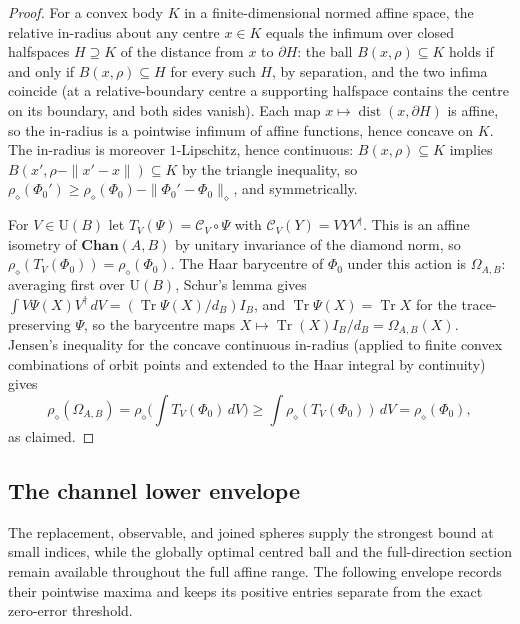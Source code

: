 \documentclass[11pt,a4paper]{article}
\theoremstyle{definition}
\theoremstyle{plain}
\theoremstyle{remark}
\DeclareMathOperator{\Tr}{Tr}
\newcommand{\Chan}{\mathbf{Chan}}
\begin{document}
\begin{proof}
For a convex body $K$ in a finite-dimensional normed affine space, the
relative in-radius about any centre $x\in K$ equals the infimum over closed
halfspaces $H\supseteq K$ of the distance from $x$ to $\partial H$: the ball
$B(x,\rho)\subseteq K$ holds if and only if $B(x,\rho)\subseteq H$ for every
such $H$, by separation, and the two infima coincide (at a
relative-boundary centre a supporting halfspace contains the centre on its
boundary, and both sides vanish). Each map
$x\mapsto\operatorname{dist}(x,\partial H)$ is affine, so the in-radius is
a pointwise infimum of affine functions, hence concave on $K$. The in-radius
is moreover $1$-Lipschitz, hence continuous: $B(x,\rho)\subseteq K$ implies
$B(x',\rho-\|x'-x\|)\subseteq K$ by the triangle inequality, so
$\rho_\diamond(\Phi_0')\ge\rho_\diamond(\Phi_0)-\|\Phi_0'-\Phi_0\|_\diamond$,
and symmetrically.

For $V\in\mathrm U(B)$ let $T_V(\Psi)=\mathcal C_V\circ\Psi$ with
$\mathcal C_V(Y)=VYV^\dagger$. This is an affine isometry of
$\Chan(A,B)$ by unitary invariance of the diamond norm, so
$\rho_\diamond(T_V(\Phi_0))=\rho_\diamond(\Phi_0)$. The Haar barycentre of
$\Phi_0$ under this action is $\Omega_{A,B}$: averaging first over
$\mathrm U(B)$, Schur's lemma gives
$\int V\Psi(X)V^\dagger\,dV=(\Tr\Psi(X)/d_B)I_B$, and $\Tr\Psi(X)=\Tr X$
for the trace-preserving $\Psi$, so the barycentre maps
$X\mapsto\Tr(X)I_B/d_B=\Omega_{A,B}(X)$. Jensen's inequality for the concave
continuous in-radius (applied to finite convex combinations of orbit points
and extended to the Haar integral by continuity) gives
\[
\rho_\diamond(\Omega_{A,B})
=\rho_\diamond\Big(\int T_V(\Phi_0)\,dV\Big)
\ge\int\rho_\diamond(T_V(\Phi_0))\,dV
=\rho_\diamond(\Phi_0),
\]
as claimed.
\end{proof}

\subsection{The channel lower envelope}

The replacement, observable, and joined spheres supply the strongest bound
at small indices, while the globally optimal centred ball and the
full-direction section remain available throughout the full affine range.
The following envelope records their pointwise maxima and keeps its positive
entries separate from the exact zero-error threshold.
\end{document}
